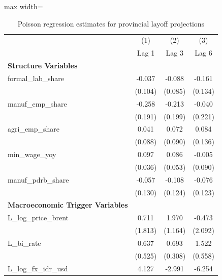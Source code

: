 \begin{table}[H]\centering
\caption{Poisson regression estimates for provincial layoff projections}
\small
\renewcommand{\arraystretch}{1.15}
\begin{adjustbox}{max width=\textwidth}
\begin{tabular}{l*{3}{c}}
\toprule
& (1) & (2) & (3) \\ & Lag 1 & Lag 3 & Lag 6 \\ \midrule
\addlinespace\textbf{Structure Variables}&                     &                     &                     \\
formal\_lab\_share&      -0.037         &      -0.088         &      -0.161         \\
            &     (0.104)         &     (0.085)         &     (0.134)         \\
manuf\_emp\_share&      -0.258         &      -0.213         &      -0.040         \\
            &     (0.191)         &     (0.199)         &     (0.221)         \\
agri\_emp\_share&       0.041         &       0.072         &       0.084         \\
            &     (0.088)         &     (0.090)         &     (0.136)         \\
min\_wage\_yoy&       0.097\sym{**} &       0.086         &      -0.005         \\
            &     (0.036)         &     (0.053)         &     (0.090)         \\
manuf\_pdrb\_share&      -0.057         &      -0.108         &      -0.076         \\
            &     (0.130)         &     (0.124)         &     (0.123)         \\
\addlinespace\textbf{Macroeconomic Trigger Variables}&                     &                     &                     \\
L\_log\_price\_brent&       0.711         &       1.970         &      -0.473         \\
            &     (1.813)         &     (1.164)         &     (2.092)         \\
L\_bi\_rate   &       0.637         &       0.693\sym{*}  &       1.522\sym{**} \\
            &     (0.525)         &     (0.308)         &     (0.558)         \\
L\_log\_fx\_idr\_usd&       4.127         &      -2.991         &      -6.254         \\

\end{tabular}
\end{adjustbox}
\end{table}
